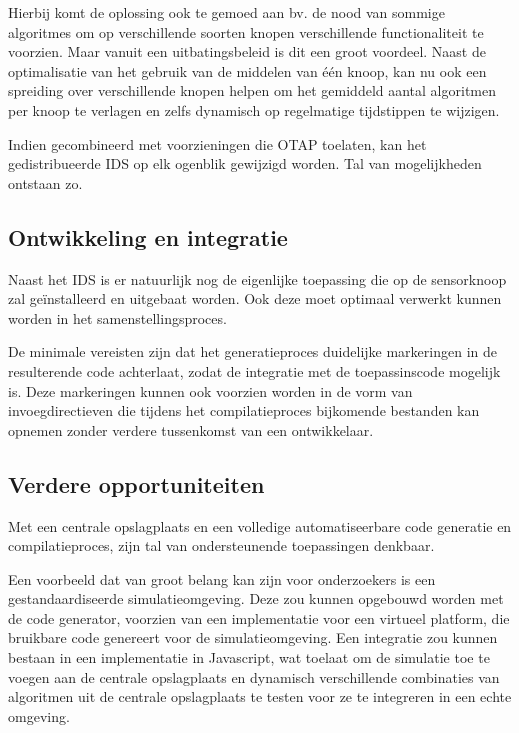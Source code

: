 Hierbij komt de oplossing ook te gemoed aan bv. de nood van sommige algoritmes
om op verschillende soorten knopen verschillende functionaliteit te voorzien.
Maar vanuit een uitbatingsbeleid is dit een groot voordeel. Naast de
optimalisatie van het gebruik van de middelen van \'e\'en knoop, kan nu ook een
spreiding over verschillende knopen helpen om het gemiddeld aantal algoritmen
per knoop te verlagen en zelfs dynamisch op regelmatige tijdstippen te wijzigen.

Indien gecombineerd met voorzieningen die OTAP toelaten, kan het
gedistribueerde IDS op elk ogenblik gewijzigd worden. Tal van mogelijkheden
ontstaan zo.

\subsection{Ontwikkeling en integratie}
\label{subsection:arch-integration}

Naast het IDS is er natuurlijk nog de eigenlijke toepassing die op de
sensorknoop zal ge\"installeerd en uitgebaat worden. Ook deze moet optimaal
verwerkt kunnen worden in het samenstellingsproces.

De minimale vereisten zijn dat het generatieproces duidelijke markeringen in de
resulterende code achterlaat, zodat de integratie met de toepassinscode
mogelijk is. Deze markeringen kunnen ook voorzien worden in de vorm van
invoegdirectieven die tijdens het compilatieproces bijkomende bestanden kan
opnemen zonder verdere tussenkomst van een ontwikkelaar.

\subsection{Verdere opportuniteiten}
\label{subsection:arch-opportunities}

Met een centrale opslagplaats en een volledige automatiseerbare code generatie
en compilatieproces, zijn tal van ondersteunende toepassingen denkbaar.

Een voorbeeld dat van groot belang kan zijn voor onderzoekers is een
gestandaardiseerde simulatieomgeving. Deze zou kunnen opgebouwd worden met de
code generator, voorzien van een implementatie voor een virtueel platform, die
bruikbare code genereert voor de simulatieomgeving. Een integratie zou kunnen
bestaan in een implementatie in Javascript, wat toelaat om de simulatie toe te
voegen aan de centrale opslagplaats en dynamisch verschillende combinaties van
algoritmen uit de centrale opslagplaats te testen voor ze te integreren in een
echte omgeving.

